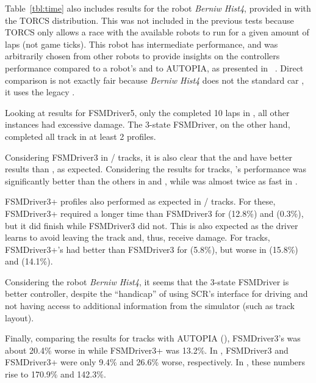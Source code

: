 Table~\ref{tbl:time} also includes results for the robot \emph{Berniw Hist4}, provided in with the TORCS distribution. This was not included in the previous tests because TORCS only allows a race with the available robots to run for a given amount of laps (not game ticks). This robot has intermediate performance, and was arbitrarily chosen from other robots to provide insights on the controllers performance compared to a robot's and to AUTOPIA, as presented in ~\cite{AUTOPIA}. Direct comparison is not exactly fair because \emph{Berniw Hist4} does not the standard car , it uses the legacy .

Looking at results for FSMDriver5, only the  completed 10 laps in , all other instances had excessive damage. The 3-state FSMDriver, on the other hand, completed all track in at least 2 profiles.

Considering FSMDriver3 in / tracks, it is also clear that the  and  have better results than , as expected. Considering the results for  tracks, 's performance was significantly better than the others in  and , while  was almost twice as fast in . 

FSMDriver3+ profiles also performed as expected in / tracks. For these, FSMDriver3+ required a longer time than FSMDriver3 for  (12.8\%) and  (0.3\%), but it did finish  while FSMDriver3 did not. This is also expected as the driver learns to avoid leaving the track and, thus, receive damage. For  tracks, FSMDriver3+'s  had better than FSMDriver3 for  (5.8\%), but worse in  (15.8\%) and  (14.1\%).

Considering the robot \emph{Berniw Hist4}, it seems that the 3-state FSMDriver is better controller, despite the ``handicap'' of using SCR's interface for driving and not having access to additional information from the simulator (such as track layout).

Finally, comparing the results for  tracks with AUTOPIA (\cite{AUTOPIA}), FSMDriver3's  was about 20.4\% worse in  while FSMDriver3+ was 13.2\%. In , FSMDriver3 and FSMDriver3+ were only 9.4\% and 26.6\% worse, respectively. In , these numbers rise to 170.9\% and 142.3\%.

